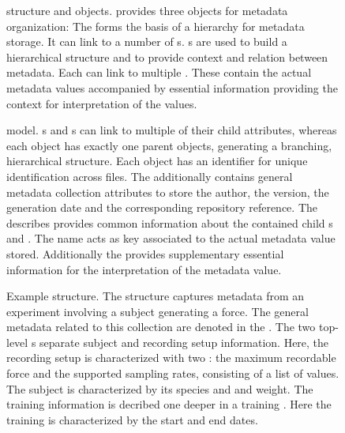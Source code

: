 \begin{figure}
    \centering
    
    \caption[ structure and objects]{ structure and objects.  provides three objects for metadata organization: The   forms the basis of a hierarchy for metadata storage. It can link to a number of  s. s are used to build a hierarchical structure and to provide context and relation between metadata. Each  can link to multiple . These contain the actual metadata values accompanied by essential information providing the context for interpretation of the values.}
    \label{fig:intro_odML_structure}
\end{figure}

\begin{figure}
    \centering
    \scalebox{0.8}{
    }
    \caption[ model]{ model. s and s can link to multiple of their child attributes, whereas each object has exactly one parent objects, generating a branching, hierarchical structure. Each object has an identifier  for unique identification across files. The  additionally contains general metadata collection attributes to store the author, the version, the generation date and the corresponding repository reference. The  describes provides common information about the contained child s and . The  name acts as key associated to the actual metadata value stored. Additionally the  provides supplementary essential information for the interpretation of the metadata value.}
    \label{fig:intro_odML_model}
\end{figure}

\begin{figure}
 \centering
 \scalebox{0.45}{
 }
 \caption[Example  structure]{Example  structure. The  structure captures metadata from an experiment involving a subject generating a force. The general metadata related to this collection are denoted in the  . The two top-level s separate subject and recording setup information. Here, the recording setup is characterized with two : the maximum recordable force and the supported sampling rates, consisting of a list of values. The subject is characterized by its species and and weight. The training information is decribed one deeper in a training . Here the training is characterized by the start and end dates.}
 \label{fig:intro_example_odml_structure}
\end{figure}


